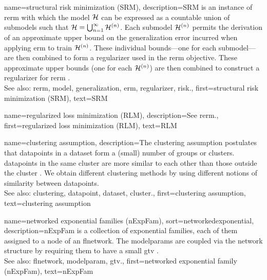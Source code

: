{name={structural risk minimization (SRM)}, 
	description={SRM is an
		instance of \gls{rerm} with which the \gls{model} $\mathcal{H}$ can be expressed 
		as a \gls{countable} union of submodels such that $\mathcal{H} = \bigcup_{n=1}^{\infty} \mathcal{H}^{(n)}$. 
		Each submodel $\mathcal{H}^{(n)}$ permits the derivation of an approximate upper bound 
		on the \gls{generalization} error incurred when applying \gls{erm} to train $\mathcal{H}^{(n)}$. 
		These individual bounds—one for each submodel—are then combined to form a \gls{regularizer} 
		used in the \gls{rerm} objective. 
        		These approximate upper bounds (one for each $\mathcal{H}^{(n)}$) are then combined 
		to construct a \gls{regularizer} for \gls{rerm} \cite[Sec.\ 7.2]{ShalevMLBook}.
				\\
		See also: \gls{rerm}, \gls{model}, \gls{generalization}, \gls{erm}, \gls{regularizer}, \gls{risk}.},
	first={structural risk minimization (SRM)},
	text={SRM}
}

{name={regularized loss minimization (RLM)},
 	description={See \gls{rerm}.},
	first={regularized loss minimization (RLM)}, 
 	text={RLM}
} 




	


{name={clustering assumption}, 
	description={The 
		\gls{clustering} assumption postulates that \glspl{datapoint} in a \gls{dataset} form a (small) number of 
		groups or \glspl{cluster}. \Glspl{datapoint} in the same \gls{cluster} are more similar to each 
		other than those outside the \gls{cluster} \cite{SemiSupervisedBook}. We obtain different 
		\gls{clustering} methods by using different notions of similarity between \glspl{datapoint}.
				\\
		See also: \gls{clustering}, \gls{datapoint}, \gls{dataset}, \gls{cluster}.},
	first={clustering assumption},
	text={clustering assumption} 
}
	
{name={networked exponential families (nExpFam)}, 
sort={networkedexponential}, 
	description={nExpFam is a collection of exponential 
		families, each of them assigned to a node of an \gls{flnetwork}. The \glspl{modelparam} are coupled 
	   	via the network structure by requiring them to have a small \gls{gtv} \cite{JungNetExp2020}.
	   		\\
		See also: \gls{flnetwork}, \gls{modelparam}, \gls{gtv}.},
	first={networked exponential family (nExpFam)},
	text={nExpFam} 
}

